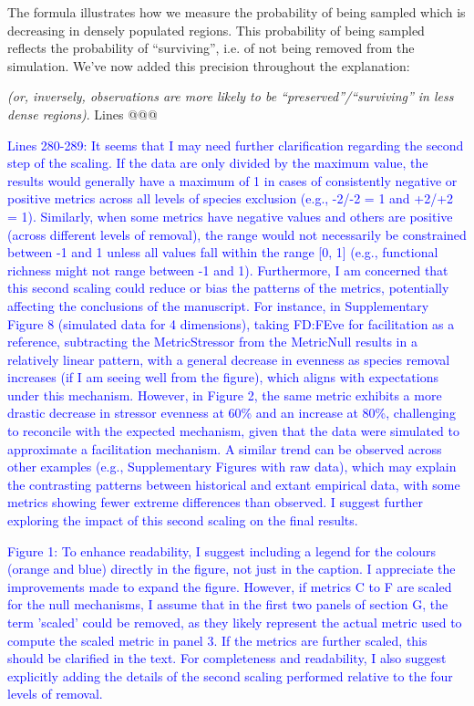 \documentclass[
]{article}
\begin{document}
The formula illustrates how we measure the probability of being sampled which is decreasing in densely populated regions.
This probability of being sampled reflects the probability of ``surviving'', i.e. of not being removed from the simulation.
We've now added this precision throughout the explanation:

\textit{(or, inversely, observations are more likely to be ``preserved''/``surviving'' in less dense regions)}. Lines @@@

\textcolor{blue}{Lines 280-289: It seems that I may need further clarification regarding the second step of the scaling.
If the data are only divided by the maximum value, the results would generally have a maximum of 1 in cases of consistently negative or positive metrics across all levels of species exclusion (e.g., -2/-2 = 1 and +2/+2 = 1).
Similarly, when some metrics have negative values and others are positive (across different levels of removal), the range would not necessarily be constrained between -1 and 1 unless all values fall within the range [0, 1] (e.g., functional richness might not range between -1 and 1).
Furthermore, I am concerned that this second scaling could reduce or bias the patterns of the metrics, potentially affecting the conclusions of the manuscript.
For instance, in Supplementary Figure 8 (simulated data for 4 dimensions), taking FD:FEve for facilitation as a reference, subtracting the MetricStressor from the MetricNull results in a relatively linear pattern, with a general decrease in evenness as species removal increases (if I am seeing well from the figure), which aligns with expectations under this mechanism.
However, in Figure 2, the same metric exhibits a more drastic decrease in stressor evenness at 60\% and an increase at 80\%, challenging to reconcile with the expected mechanism, given that the data were simulated to approximate a facilitation mechanism.
A similar trend can be observed across other examples (e.g., Supplementary Figures with raw data), which may explain the contrasting patterns between historical and extant empirical data, with some metrics showing fewer extreme differences than observed.
I suggest further exploring the impact of this second scaling on the final results.}


\textcolor{blue}{Figure 1: To enhance readability, I suggest including a legend for the colours (orange and blue) directly in the figure, not just in the caption.
I appreciate the improvements made to expand the figure.
However, if metrics C to F are scaled for the null mechanisms, I assume that in the first two panels of section G, the term 'scaled' could be removed, as they likely represent the actual metric used to compute the scaled metric in panel 3.
If the metrics are further scaled, this should be clarified in the text.
For completeness and readability, I also suggest explicitly adding the details of the second scaling performed relative to the four levels of removal.}
\end{document}
